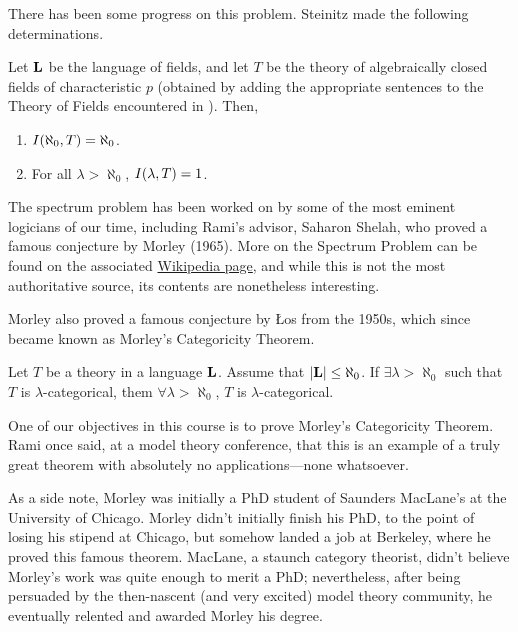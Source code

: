 There has been some progress on this problem. Steinitz made the following determinations.

\begin{boxtheorem}[Steinitz]
    Let $\mathbf{L}$ be the language of fields, and let $T$ be the theory of algebraically closed fields of characteristic $p$ (obtained by adding the appropriate sentences to the Theory of Fields encountered in ). Then,
    \begin{enumerate}[label = \normalfont \arabic*.]
        \item $I\!\left( \aleph_{0}, T \right) = \aleph_{0}$.
        \item For all $\lambda > \aleph_{0}$, $I\!\left( \lambda, T \right) = 1$.
    \end{enumerate}
\end{boxtheorem}

The spectrum problem has been worked on by some of the most eminent logicians of our time, including Rami's advisor, Saharon Shelah, who proved a famous conjecture by Morley (1965). More on the Spectrum Problem can be found on the associated \href{https://en.wikipedia.org/wiki/Spectrum_of_a_theory#:~:text=More%20precisely%2C%20for%20any%20complete,of%20a%20countable%20theory%20T.}{Wikipedia page}, and while this is not the most authoritative source, its contents are nonetheless interesting.

Morley also proved a famous conjecture by Łos from the 1950s, which since became known as Morley's Categoricity Theorem.

\begin{boxtheorem}
    Let $T$ be a theory in a language $\mathbf{L}$. Assume that $\left\lvert \mathbf{L} \right\rvert \leq \aleph_{0}$. If $\exists \lambda > \aleph_{0}$ such that $T$ is $\lambda$-categorical, them $\forall \lambda > \aleph_{0}$, $T$ is $\lambda$-categorical.
\end{boxtheorem}

One of our objectives in this course is to prove Morley's Categoricity Theorem. Rami once said, at a model theory conference, that this is an example of a truly great theorem with absolutely no applications---none whatsoever.

As a side note, Morley was initially a PhD student of Saunders MacLane's at the University of Chicago. Morley didn't initially finish his PhD, to the point of losing his stipend at Chicago, but somehow landed a job at Berkeley, where he proved this famous theorem. MacLane, a staunch category theorist, didn't believe Morley's work was quite enough to merit a PhD; nevertheless, after being persuaded by the then-nascent (and very excited) model theory community, he eventually relented and awarded Morley his degree.

